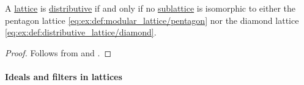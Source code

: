 \begin{corollary}\label{thm:distributive_lattice_characterization}
  A \hyperref[def:lattice]{lattice} is \hyperref[def:modular_lattice]{distributive} if and only if no \hyperref[def:lattice/submodel]{sublattice} is isomorphic to either the pentagon lattice \eqref{eq:ex:def:modular_lattice/pentagon} nor the diamond lattice \eqref{eq:ex:def:distributive_lattice/diamond}.
\end{corollary}
\begin{proof}
  Follows from  and .
\end{proof}

\paragraph{Ideals and filters in lattices}

